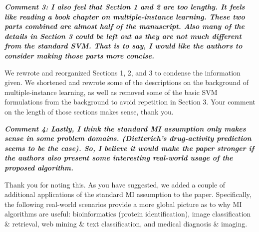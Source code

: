\documentclass[a4paper,notitlepage]{article}
\begin{document}
\noindent \textbf{\textit{Comment 3: I also feel that Section 1 and 2 are too lengthy. It feels like reading a book chapter on multiple-instance learning. These two parts combined are almost half of the manuscript. Also many of the details in Section 3 could be left out as they are not much different from the standard SVM. That is to say, I would like the authors to consider making those parts more concise. }}

\medskip

\noindent We rewrote and reorganized Sections 1, 2, and 3 to condense the information given. We shortened and rewrote some of the descriptions on the background of multiple-instance learning, as well as removed some of the basic SVM formulations from the background to avoid repetition in Section 3. Your comment on the length of those sections makes sense, thank you.

\noindent \textbf{\textit{Comment 4: Lastly, I think the standard MI assumption only makes sense in some problem domains. (Dietterich's drug-activity prediction seems to be the case). So, I believe it would make the paper stronger if the authors also present some interesting real-world usage of the proposed algorithm. }}

\medskip

\noindent Thank you for noting this. As you have suggested, we added a couple of additional applications of the standard MI assumption to the paper. Specifically, the following real-world scenarios provide a more global picture as to why MI algorithms are useful: bioinformatics (protein identification), image classification \& retrieval, web mining \& text classification, and medical diagnosis \& imaging.
\end{document}
